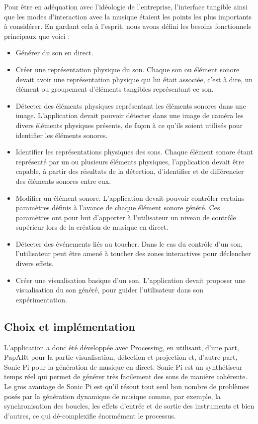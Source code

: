 Pour être en adéquation avec l'idéologie de l'entreprise, l'interface tangible ainsi que les modes d'interaction avec la musique étaient les points les plus importants à considérer. En gardant cela à l'esprit, nous avons défini les besoins fonctionnels principaux que voici :
\begin{itemize}
\item Générer du son en direct.
\item Créer une représentation physique du son. Chaque son ou élément sonore devait avoir une représentation physique qui lui était associée, c'est à dire, un élément ou groupement d'éléments tangibles représentant ce son.
\item Détecter des éléments physiques représentant les éléments sonores dans une image. L'application devait pouvoir détecter dans une image de caméra les divers éléments physiques présents, de façon à ce qu'ils soient utilisés pour identifier les éléments sonores.
\item Identifier les représentations physiques des sons. Chaque élément sonore étant représenté par un ou plusieurs éléments physiques, l'application devait être capable, à partir des résultats de la détection, d'identifier et de différencier des éléments sonores entre eux. 
\item Modifier un élément sonore. L'application devait pouvoir contrôler certains paramètres définis à l'avance de chaque élément sonore généré. Ces paramètres ont pour but d'apporter à l'utilisateur un niveau de contrôle supérieur lors de la création de musique en direct.
\item Détecter des événements liés au toucher. Dans le cas du contrôle d'un son, l'utilisateur peut être amené à toucher des zones interactives pour déclencher divers effets.
\item Créer une visualisation basique d'un son. L'application devait proposer une visualisation du son généré, pour guider l'utilisateur dans son expérimentation.
\end{itemize}

\subsection{Choix et implémentation}
\label{subsec:reartable:impl}
L'application a donc été développée avec Processing, en utilisant, d'une part, PapARt pour la partie visualisation, détection et projection et, d'autre part, Sonic Pi\cite{sonicpi} pour la génération de musique en direct.
Sonic Pi est un synthétiseur temps réel qui permet de générer très facilement des sons de manière cohérente. Le gros avantage de Sonic Pi est qu'il résout tout seul bon nombre de problèmes posés par la génération dynamique de musique comme, par exemple, la synchronisation des boucles, les effets d'entrée et de sortie des instruments et bien d'autres, ce qui dé-complexifie énormément le processus.

